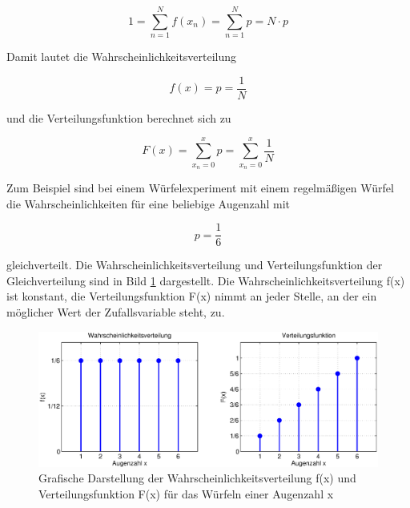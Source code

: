 \begin{equation}\label{eq:fourhundredfourteen}
1=\sum _{n=1}^{N}f(x_{n}) =\sum _{n=1}^{N}p =N\cdot p
\end{equation}

\noindent Damit lautet die Wahrscheinlichkeitsverteilung 

\begin{equation}\label{eq:fourhundredfifteen}
f(x)=p=\dfrac{1}{N}
\end{equation}

\noindent und die Verteilungsfunktion berechnet sich zu

\begin{equation}\label{eq:fourhundredsixteen}
F(x)=\sum _{x_{n} =0}^{x}p =\sum _{x_{n} =0}^{x}\dfrac{1}{N}
\end{equation}

\noindent Zum Beispiel sind bei einem W\"{u}rfelexperiment mit einem regelm\"{a}{\ss}igen W\"{u}rfel die Wahrscheinlichkeiten f\"{u}r eine beliebige Augenzahl mit 

\begin{equation}\label{eq:fourhundredseventeen}
p=\dfrac{1}{6}
\end{equation}

\noindent gleichverteilt. Die Wahrscheinlichkeitsverteilung und Verteilungsfunktion der Gleichverteilung sind in Bild \ref{fig:Diskret_Gleichverteilung} dargestellt. Die Wahrscheinlichkeitsverteilung f(x) ist konstant, die Verteilungsfunktion F(x) nimmt an jeder Stelle, an der ein m\"{o}glicher Wert der Zufallsvariable steht, zu. 

\noindent 
\begin{figure}[H]
  \centerline{\includegraphics[width=1\textwidth]{Kapitel4/Bilder/image9}}
  \caption{Grafische Darstellung der Wahrscheinlichkeitsverteilung f(x) und Verteilungsfunktion F(x) f\"{u}r das W\"{u}rfeln einer Augenzahl x}
  \label{fig:Diskret_Gleichverteilung}
\end{figure}

